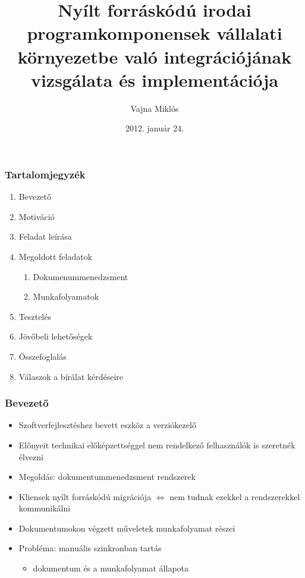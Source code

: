 \documentclass{beamer}
\author{Vajna Mikl\'{o}s}
\begin{document}
\title{Nyílt forráskódú irodai programkomponensek vállalati környezetbe való integrációjának vizsgálata és implementációja}
\date{2012. január 24.}

\frame{\titlepage}

\begin{frame}
\frametitle{Tartalomjegyzék}
\begin{enumerate}
\item Bevezető
\item Motiváció
\item Feladat leírása
\item Megoldott feladatok
\begin{enumerate}
\item Dokumenummenedzsment
\item Munkafolyamatok
\end{enumerate}
\item Tesztelés
\item Jövőbeli lehetőségek
\item Összefoglalás
\item Válaszok a bírálat kérdéseire
\end{enumerate}
\end{frame}

\begin{frame}
\frametitle{Bevezető}
\begin{itemize}
\item Szoftverfejlesztéshez bevett eszköz a verziókezelő
\item Előnyeit technikai előképzettséggel nem rendelkező felhasználók is szeretnék élvezni
\item Megoldás: dokumentummenedzsment rendszerek
\item Kliensek nyílt forráskódú migrációja $\Leftrightarrow$ nem tudnak ezekkel a rendszerekkel kommunikálni
\item Dokumentumokon végzett műveletek munkafolyamat részei
\item Probléma: manuális szinkronban tartás
\begin{itemize}
\item dokumentum és a munkafolyamat állapota
\end{itemize}
\end{itemize}
\end{frame}
\end{document}
